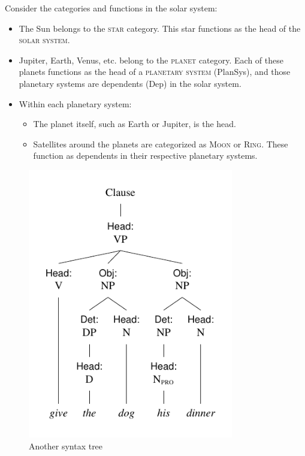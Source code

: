 Consider the categories and functions in the solar system:
\begin{itemize}[noitemsep]
    \item The Sun belongs to the \textsc{star} category. This star functions as the head of the \textsc{solar system}.
    \item Jupiter, Earth, Venus, etc. belong to the \textsc{planet} category. Each of these planets functions as the head of a \textsc{planetary system} (PlanSys), and those planetary systems are dependents (Dep) in the solar system.
    \item Within each planetary system:
    \begin{itemize}[noitemsep]
        \item The planet itself, such as Earth or Jupiter, is the head.
        \item Satellites around the planets are categorized as \textsc{Moon} or \textsc{Ring}. These function as dependents in their respective planetary systems.
    \end{itemize}
\end{itemize}


\begin{figure} %
  \centering
  \includegraphics[width=0.8\textwidth]{figures/dogdinner.pdf}
  \caption{Another syntax tree}
  \label{fig:tree2}
\end{figure}

